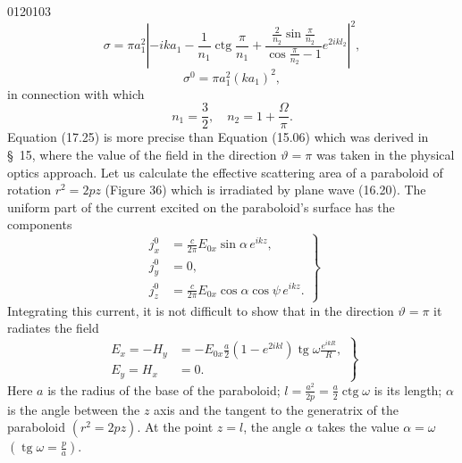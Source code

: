 \begin{scanpage}{0120}{103}
\[\sigma=\pi a_1^2\left|-ika_1-\frac1{n_1}\operatorname{ctg}\frac\pi{n_1}+\frac{\frac2{n_2}\sin\frac\pi{n_2}}{\cos\frac\pi{n_2}-1}e^{2ikl_2}\right|^2,\tag{17.25}\]
\[\sigma^0=\pi a_1^2(ka_1)^2,\tag{17.26}\]
in connection with which
\[n_1=\frac32,\quad n_2=1+\frac\Omega\pi.\tag{17.27}\]
Equation (17.25) is more precise than Equation (15.06) which was derived in \S\ 15, where the value of the field in the direction $\vartheta=\pi$ was taken in the physical optics approach.
Let us calculate the effective scattering area of a paraboloid of rotation $r^2=2pz$ (Figure 36) which is irradiated by plane wave (16.20). The uniform part of the current excited on the paraboloid's surface has the components
\[\left.\begin{aligned}j_x^0&=\frac c{2\pi}E_{0x}\sin\alpha\,e^{ikz},\\j_y^0&=0,\\j_z^0&=\frac c{2\pi}E_{0x}\cos\alpha\cos\psi\,e^{ikz}.\end{aligned}\right\}\tag{18.01}\]
Integrating this current, it is not difficult to show that in the direction $\vartheta=\pi$ it radiates the field
\[\left.\begin{aligned}E_x=-H_y&=-E_{0x}\frac a2(1-e^{2ikl})\operatorname{tg}\omega\frac{e^{ikR}}R,\\E_y=H_x&=0.\end{aligned}\right\}\tag{18.02}\]
Here $a$ is the radius of the base of the paraboloid; $l=\frac{a^2}{2p}=\frac a2\operatorname{ctg}\omega$ is its length; $\alpha$ is the angle between the $z$ axis and the tangent to the generatrix of the paraboloid $(r^2=2pz)$. At the point $z=l$, the angle $\alpha$ takes the value $\alpha=\omega$ $(\operatorname{tg}\omega=\frac pa)$.
\end{scanpage}
